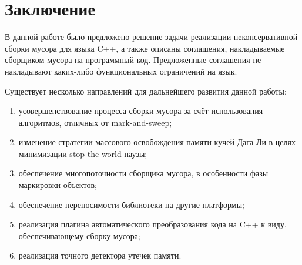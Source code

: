 \section*{Заключение}

В данной работе было предложено решение задачи реализации неконсервативной сборки мусора для языка C++,
а также описаны соглашения, накладываемые сборщиком мусора на программный код.
Предложенные соглашения не накладывают каких-либо функциональных ограничений на язык.

Существует несколько направлений для дальнейшего развития данной работы:
\begin{enumerate}
\item усовершенствование процесса сборки мусора за счёт использования алгоритмов, отличных от mark-and-sweep;
\item изменение стратегии массового освобождения памяти кучей Дага Ли в целях минимизации stop-the-world паузы;
\item обеспечение многопоточности сборщика мусора, в особенности фазы маркировки объектов;
\item обеспечение переносимости библиотеки на другие платформы;
\item реализация плагина автоматического преобразования кода на C++ к виду, обеспечивающему сборку мусора;
\item реализация точного детектора утечек памяти.
\end{enumerate}